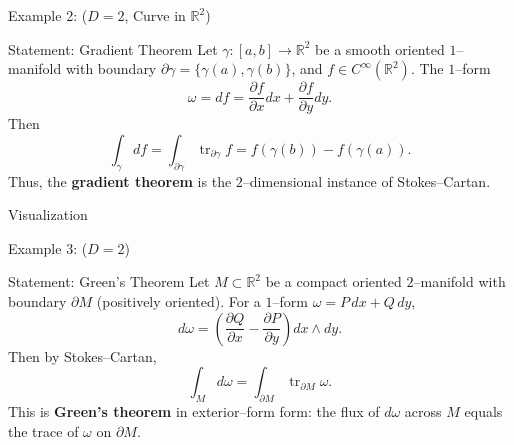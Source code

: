 \begin{frame}{Example 2: (\(D=2\), Curve in $\mathbb{R}^2$)}
\begin{block}{Statement: Gradient Theorem }
Let $\gamma:[a,b]\to\mathbb{R}^2$ be a smooth oriented $1$–manifold with boundary $\partial\gamma=\{\gamma(a),\gamma(b)\}$,
and \(f\in C^\infty(\mathbb{R}^2)\).
The $1$–form
\[
\omega = df = \frac{\partial f}{\partial x}dx + \frac{\partial f}{\partial y}dy.
\]
Then
\[
\int_{\gamma}d f
=\int_{\partial\gamma}\operatorname{tr}_{\partial\gamma}f
=f(\gamma(b))-f(\gamma(a)).
\]
Thus, the \textbf{gradient theorem} is the $2$–dimensional instance of Stokes–Cartan.
\end{block}
\end{frame}

\begin{frame}{Visualization}
    \begin{center}
\end{center}
\end{frame}

\begin{frame}{Example 3: (\(D=2\))}
\vspace{-0.3cm}
\begin{block}{Statement: Green’s Theorem }
Let $M\subset\mathbb{R}^2$ be a compact oriented $2$–manifold with boundary $\partial M$ (positively oriented).
For a $1$–form $\omega = P\,dx + Q\,dy$,
\vspace{-0.2cm}
\[
d\omega
=\left(\frac{\partial Q}{\partial x}-\frac{\partial P}{\partial y}\right)dx\wedge dy.
\]
\vspace{-0.2cm}
Then by Stokes–Cartan,
\vspace{-0.2cm}
\[
\int_M d\omega
=\int_{\partial M}\operatorname{tr}_{\partial M}\omega.
\]
This is \textbf{Green’s theorem} in exterior–form form:
the flux of $d\omega$ across $M$ equals the trace of $\omega$ on $\partial M$.
\end{block}

\begin{center}
\vspace{-0.2cm}
\end{center}
\end{frame}


